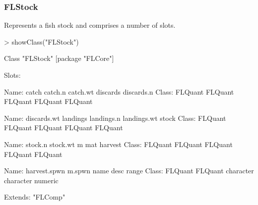\documentclass{beamer}%
\begin{document}
\begin{frame}[containsverbatim]
  \frametitle{FLStock}
Represents a fish stock and comprises a number of slots.
{\tiny{
\begin{Schunk}
\begin{Sinput}
> showClass("FLStock")
\end{Sinput}
\begin{Soutput}
Class "FLStock" [package "FLCore"]

Slots:
                                                                       
Name:         catch      catch.n     catch.wt     discards   discards.n
Class:      FLQuant      FLQuant      FLQuant      FLQuant      FLQuant
                                                                       
Name:   discards.wt     landings   landings.n  landings.wt        stock
Class:      FLQuant      FLQuant      FLQuant      FLQuant      FLQuant
                                                                       
Name:       stock.n     stock.wt            m          mat      harvest
Class:      FLQuant      FLQuant      FLQuant      FLQuant      FLQuant
                                                                       
Name:  harvest.spwn       m.spwn         name         desc        range
Class:      FLQuant      FLQuant    character    character      numeric

Extends: "FLComp"
\end{Soutput}
\end{Schunk}
}}
\end{frame}
\end{document}
